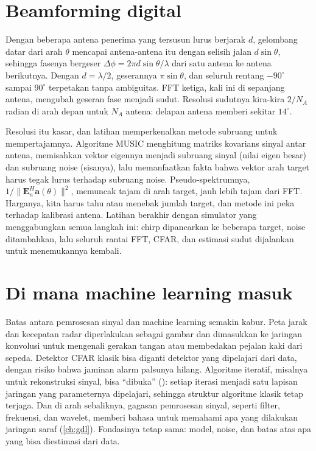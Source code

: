 \section{Beamforming digital}

Dengan beberapa antena penerima yang tersusun lurus berjarak $d$, gelombang datar dari arah $\theta$
mencapai antena-antena itu dengan selisih jalan $d\sin\theta$, sehingga fasenya bergeser
$\Delta\phi=2\pi d\sin\theta/\lambda$ dari satu antena ke antena berikutnya. Dengan $d=\lambda/2$, geserannya
$\pi\sin\theta$, dan seluruh rentang $-90^\circ$ sampai $90^\circ$ terpetakan tanpa ambiguitas. FFT ketiga,
kali ini di sepanjang antena, mengubah geseran fase menjadi sudut. Resolusi sudutnya kira-kira $2/N_A$ radian
di arah depan untuk $N_A$ antena: delapan antena memberi sekitar $14^\circ$.

Resolusi itu kasar, dan latihan memperkenalkan metode subruang untuk mempertajamnya. Algoritme MUSIC menghitung
matriks kovarians sinyal antar antena, memisahkan vektor eigennya menjadi subruang sinyal (nilai eigen besar)
dan subruang noise (sisanya), lalu memanfaatkan fakta bahwa vektor arah target harus tegak lurus terhadap
subruang noise. Pseudo-spektrumnya, $1/\|\bm E_n^{H}\bm a(\theta)\|^2$, memuncak tajam di arah target, jauh
lebih tajam dari FFT. Harganya, kita harus tahu atau menebak jumlah target, dan metode ini peka terhadap
kalibrasi antena. Latihan berakhir dengan simulator yang menggabungkan semua langkah ini: chirp dipancarkan
ke beberapa target, noise ditambahkan, lalu seluruh rantai FFT, CFAR, dan estimasi sudut dijalankan untuk
menemukannya kembali.

\section{Di mana machine learning masuk}

Batas antara pemrosesan sinyal dan machine learning semakin kabur. Peta jarak dan kecepatan radar
diperlakukan sebagai gambar dan dimasukkan ke jaringan konvolusi untuk mengenali gerakan tangan atau
membedakan pejalan kaki dari sepeda. Detektor CFAR klasik bisa diganti detektor yang dipelajari dari data,
dengan risiko bahwa jaminan alarm palsunya hilang. Algoritme iteratif, misalnya untuk rekonstruksi sinyal,
bisa ``dibuka'' (): setiap iterasi menjadi satu lapisan jaringan yang parameternya dipelajari,
sehingga struktur algoritme klasik tetap terjaga. Dan di arah sebaliknya, gagasan pemrosesan sinyal, seperti
filter, frekuensi, dan wavelet, memberi bahasa untuk memahami apa yang dilakukan jaringan saraf
(\cref{ch:gdl}). Fondasinya tetap sama: model, noise, dan batas atas apa yang bisa diestimasi dari data.

